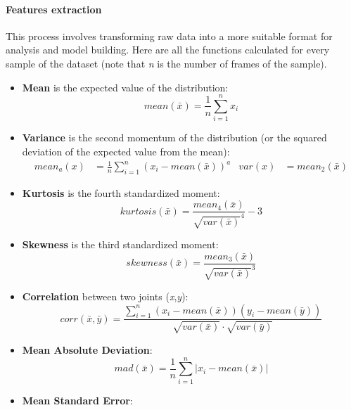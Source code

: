 \paragraph{Features extraction}
This process involves transforming raw data into a more suitable format for analysis and model building.
Here are all the functions calculated for every sample of the dataset (note that \textit{n} is the number of frames of the sample). \\
\begin{itemize}
    \item \textbf{Mean} is the expected value of the distribution:
        \begin{equation}
            mean(\bar{x}) = \frac{1}{n} \sum_{i=1}^{n} x_i
        \end{equation}
    \item \textbf{Variance} is the second momentum of the distribution (or the squared deviation of the expected value from the mean):
        \begin{align}
            mean_a(x) &= \frac{1}{n} \sum_{i=1}^{n} (x_i - mean(\bar{x}))^a &
            var(x) &= mean_2(\bar{x})
        \end{align}
    \item \textbf{Kurtosis} is the fourth standardized moment:
        \begin{equation}
            kurtosis(\bar{x}) = \frac{mean_4(\bar{x})}{\sqrt{var(\bar{x})}^4} - 3
        \end{equation}
    \item \textbf{Skewness} is the third standardized moment:
        \begin{equation}
            skewness(\bar{x}) = \frac{mean_3(\bar{x})}{\sqrt{var(\bar{x})}^3}
        \end{equation}
    \item \textbf{Correlation} between two joints (\textit{x},\textit{y}):
        \begin{equation}
            corr(\bar{x},\bar{y}) = \frac{\sum_{i=1}^n (x_i - mean(\bar{x}))(y_i - mean(\bar{y}))}{\sqrt{var(\bar{x})}\cdot\sqrt{var(\bar{y})}}
        \end{equation}
    \item \textbf{Mean Absolute Deviation}:
        \begin{equation}
            mad(\bar{x}) = \frac{1}{n} \sum_{i=1}^{n} |x_i - mean(\bar{x})|
        \end{equation}
    \item \textbf{Mean Standard Error}:

\end{itemize}
